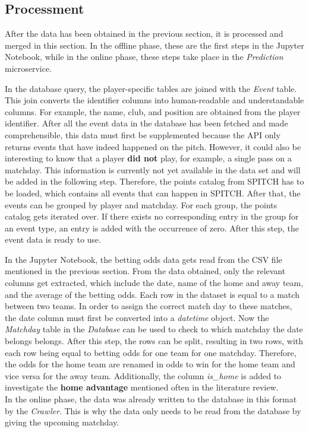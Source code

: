 \subsection{Processment}

After the data has been obtained in the previous section, it is processed and merged in this section. In the offline phase, these are the first steps in the Jupyter Notebook, while in the online phase, these steps take place in the \emph{Prediction} microservice. 

In the database query, the player-specific tables are joined with the \emph{Event} table. This join converts the identifier columns into human-readable and understandable columns. For example, the name, club, and position are obtained from the player identifier. After all the event data in the database has been fetched and made comprehensible, this data must first be supplemented because the API only returns events that have indeed happened on the pitch. However, it could also be interesting to know that a player \textbf{did not} play, for example, a single pass on a matchday. This information is currently not yet available in the data set and will be added in the following step. Therefore, the points catalog from SPITCH \parencite[see][]{spitch_points_nodate} has to be loaded, which contains all events that can happen in SPITCH. After that, the events can be grouped by player and matchday. For each group, the points catalog gets iterated over. If there exists no corresponding entry in the group for an event type, an entry is added with the occurrence of zero. After this step, the event data is ready to use.

In the Jupyter Notebook, the betting odds data gets read from the CSV file mentioned in the previous section. From the data obtained, only the relevant columns get extracted, which include the date, name of the home and away team, and the average of the betting odds. Each row in the dataset is equal to a match between two teams. In order to assign the correct match day to these matches, the date column must first be converted into a \emph{datetime} object. Now the \emph{Matchday} table in the \emph{Database} can be used to check to which matchday the date belongs belongs. After this step, the rows can be split, resulting in two rows, with each row being equal to betting odds for one team for one matchday. Therefore, the odds for the home team are renamed in odds to win for the home team and vice versa for the away team. Additionally, the column \emph{is\_home} is added to investigate the \textbf{home advantage} mentioned often in the literature review. \\
In the online phase, the data was already written to the database in this format by the \emph{Crawler}. This is why the data only needs to be read from the database by giving the upcoming matchday.

